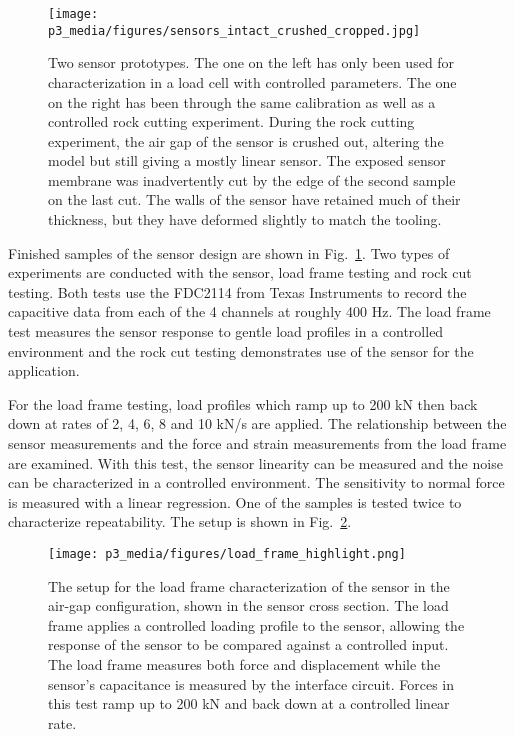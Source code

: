 \begin{figure}
\centering
\texttt{[image: p3\_media/figures/sensors\_intact\_crushed\_cropped.jpg]}
\caption{Two sensor prototypes. The one on the left has only been used for characterization 
in a load cell with controlled parameters. The one on the right has been through the same 
calibration as well as a controlled rock cutting experiment. During the rock cutting experiment,
the air gap of the sensor is crushed out, altering the model but still giving a mostly linear sensor.
The exposed sensor membrane was inadvertently cut by the edge of the second sample on the last cut.
The walls of the sensor have retained much of their thickness, but they have deformed slightly to 
match the tooling.}
\label{fig:sensors_prototypes}
\end{figure}

Finished samples of the sensor design are shown
in Fig.~\ref{fig:sensors_prototypes}.
Two types of experiments are conducted with the sensor, 
load frame testing and rock cut testing.
Both tests use the FDC2114 from Texas Instruments to record the 
capacitive data from each of the 4 channels at roughly 400 Hz. 
The load frame test measures the sensor response to gentle load profiles in a controlled environment
and the rock cut testing demonstrates use of the sensor for the application.

For the load frame testing, load profiles which ramp up to 200 kN 
then back down at rates of 2, 4, 6, 8 and 10 kN/s are applied. 
The relationship between the sensor measurements 
and the force and strain measurements from the load frame are examined.
With this test, the sensor linearity can be measured and the noise
can be characterized in a controlled environment. 
The sensitivity to normal force is measured with a linear regression.
One of the samples is tested twice to characterize repeatability.
The setup is shown in Fig.~\ref{fig:loadframe}.

\begin{figure}
\centering
\texttt{[image: p3\_media/figures/load\_frame\_highlight.png]}
\caption{The setup for the load frame characterization of the sensor in the air-gap configuration, 
shown in the sensor cross section.
The load frame applies a controlled loading profile to the sensor, allowing the response of the sensor
to be compared against a controlled input. The load frame measures both force and displacement while
the sensor's capacitance is measured by the interface circuit.
Forces in this test ramp up to 200 kN and back down at a controlled linear rate.}
\label{fig:loadframe}
\end{figure}

